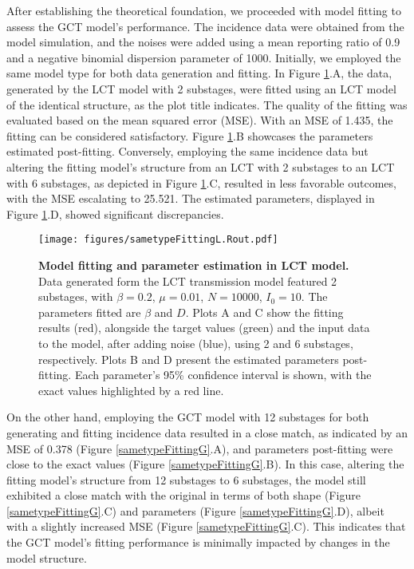 \documentclass[12pt]{article}
\begin{document}
After establishing the theoretical foundation, we proceeded with model fitting to assess the GCT model's performance. The incidence data were obtained from the model simulation, and the noises were added using a mean reporting ratio of 0.9 and a negative binomial dispersion parameter of 1000. Initially, we employed the same model type for both data generation and fitting. In Figure \ref{sametypeFittingL}.A, the data, generated by the LCT model with 2 substages, were fitted using an LCT model of the identical structure, as the plot title indicates. The quality of the fitting was evaluated based on the mean squared error (MSE). With an MSE of 1.435, the fitting can be considered satisfactory. Figure \ref{sametypeFittingL}.B showcases the parameters estimated post-fitting. Conversely, employing the same incidence data but altering the fitting model's structure from an LCT with 2 substages to an LCT with 6 substages, as depicted in Figure \ref{sametypeFittingL}.C, resulted in less favorable outcomes, with the MSE escalating to 25.521. The estimated parameters, displayed in Figure \ref{sametypeFittingL}.D, showed significant discrepancies. 

\begin{figure}[h!]
    \centering
    \texttt{[image: figures/sametypeFittingL.Rout.pdf]}
    \caption{\textbf{Model fitting and parameter estimation in LCT model.} \\ Data generated form the LCT transmission model featured 2 substages, with $\beta=0.2$, $\mu=0.01$, $N=10000$, $I_0=10$. The parameters fitted are $\beta$ and $D$. Plots A and C show the fitting results (red), alongside the target values (green) and the input data to the model, after adding noise (blue), using 2 and 6 substages, respectively. Plots B and D present the estimated parameters post-fitting. Each parameter's 95\% confidence interval is shown, with the exact values highlighted by a red line.}
    \label{sametypeFittingL}
\end{figure}

On the other hand, employing the GCT model with 12 substages for both generating and fitting incidence data resulted in a close match, as indicated by an MSE of 0.378 (Figure \ref{sametypeFittingG}.A), and parameters post-fitting were close to the exact values (Figure \ref{sametypeFittingG}.B). In this case, altering the fitting model's structure from 12 substages to 6 substages, the model still exhibited a close match with the original in terms of both shape (Figure \ref{sametypeFittingG}.C) and parameters (Figure \ref{sametypeFittingG}.D), albeit with a slightly increased MSE (Figure \ref{sametypeFittingG}.C). This indicates that the GCT model's fitting performance is minimally impacted by changes in the model structure.
\end{document}
